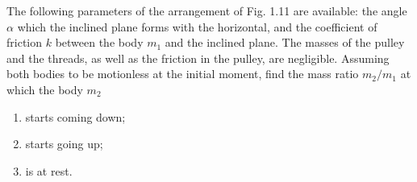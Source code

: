 \item The following parameters of the arrangement of Fig. 1.11 are available: the angle $\alpha$ which the inclined plane forms with the horizontal, and the coefficient of friction $k$ between the body $m_1$ and the inclined plane. The masses of the pulley and the threads, as well as the friction in the pulley, are negligible. Assuming both bodies to be motionless at the initial moment, find the mass ratio $m_2/m_1$ at which the body $m_2$
    \begin{enumerate}
        \item starts coming down;
        \item starts going up;
        \item is at rest.
    \end{enumerate}